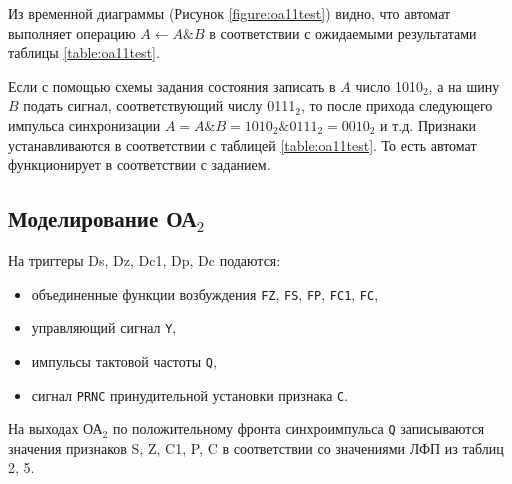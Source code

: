Из временной диаграммы (Рисунок \ref{figure:oa11test}) видно, что автомат выполняет операцию $A \leftarrow A \& B$ в соответствии с ожидаемыми результатами таблицы \ref{table:oa11test}. 

Если с помощью схемы задания состояния записать в $A$ число 1010$_2$, а на шину $B$ подать сигнал, соответствующий числу 0111$_2$, то после прихода следующего импульса синхронизации $A = A \& B = 1010_2 \& 0111_2 = 0010_2$ и т.д. Признаки устанавливаются в соответствии с таблицей \ref{table:oa11test}. То есть автомат функционирует в соответствии с заданием.

\clearpage
\subsection{Моделирование ОА$_2$}

На триггеры Ds, Dz, Dc1, Dp, Dc подаются:
\begin{itemize}
	\item объединенные функции возбуждения \texttt{FZ}, \texttt{FS}, \texttt{FP}, \texttt{FC1}, \texttt{FC},
	\item управляющий сигнал \texttt{Y},
	\item импульсы тактовой частоты \texttt{Q},
	\item сигнал \texttt{PRNC} принудительной установки признака \texttt{С}.
\end{itemize} 

На выходах ОА$_2$ по положительному фронта синхроимпульса \texttt{Q} записываются значения признаков S, Z, C1, P, C в соответствии со значениями ЛФП из таблиц 2, 5.

